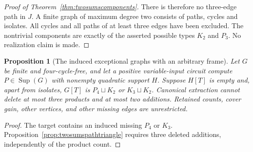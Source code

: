 \documentclass[11pt]{article}
\newcommand{\Sup}{\operatorname{Sup}}
\newtheorem{proposition}[theorem]{Proposition}
\theoremstyle{definition}
\theoremstyle{remark}
\begin{document}
\begin{proof}[Proof of Theorem~\ref{thm:twosumscomponents}]
There is therefore no three-edge path in $J$. A finite graph of maximum degree two consists of paths, cycles and isolates. All cycles and all paths of at least three edges have been excluded. The nontrivial components are exactly of the asserted possible types $K_2$ and $P_3$. No realization claim is made.
\end{proof}

\begin{proposition}[The induced exceptional graphs with an arbitrary frame]\label{prop:exceptionalarbitrary}
Let $G$ be finite and four-cycle-free, and let a positive variable-input circuit compute $P\in\Sup(G)$ with nonempty quadratic support $H$. Suppose $H[T]$ is empty and, apart from isolates, $G[T]$ is $P_4\sqcup K_2$ or $K_3\sqcup K_2$. Canonical extraction cannot delete at most three products and at most two additions. Retained counts, cover gain, other vertices, and other missing edges are unrestricted.
\end{proposition}
\begin{proof}
The target contains an induced missing $P_4$ or $K_3$. Proposition~\ref{prop:twosumspathtriangle} requires three deleted additions, independently of the product count.
\end{proof}
\end{document}
